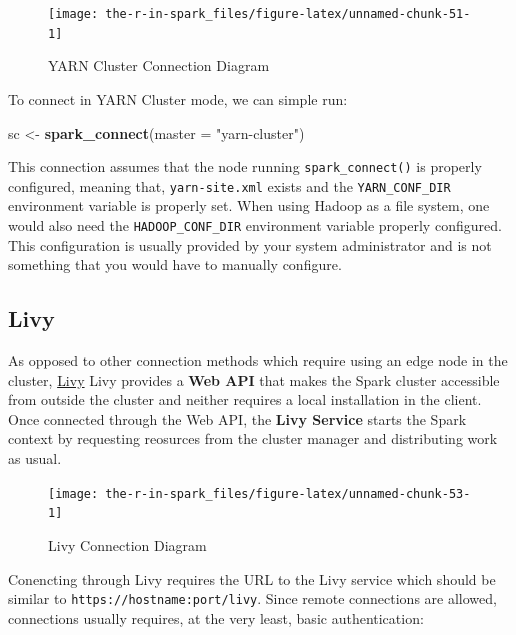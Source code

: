 \documentclass[]{book}
\newenvironment{Shaded}{\begin{snugshade}}{\end{snugshade}}
\newcommand{\DataTypeTok}[1]{\textcolor[rgb]{0.13,0.29,0.53}{#1}}
\newcommand{\KeywordTok}[1]{\textcolor[rgb]{0.13,0.29,0.53}{\textbf{#1}}}
\newcommand{\NormalTok}[1]{#1}
\newcommand{\StringTok}[1]{\textcolor[rgb]{0.31,0.60,0.02}{#1}}
\theoremstyle{definition}
\theoremstyle{definition}
\theoremstyle{definition}
\theoremstyle{remark}
\begin{document}
\begin{figure}

{\centering \texttt{[image: the-r-in-spark\_files/figure-latex/unnamed-chunk-51-1]} 

}

\caption{YARN Cluster Connection Diagram}\label{fig:unnamed-chunk-51}
\end{figure}

To connect in YARN Cluster mode, we can simple run:

\begin{Shaded}
\begin{Highlighting}[]
\NormalTok{sc <-}\StringTok{ }\KeywordTok{spark_connect}\NormalTok{(}\DataTypeTok{master =} \StringTok{"yarn-cluster"}\NormalTok{)}
\end{Highlighting}
\end{Shaded}

This connection assumes that the node running \texttt{spark\_connect()}
is properly configured, meaning that, \texttt{yarn-site.xml} exists and
the \texttt{YARN\_CONF\_DIR} environment variable is properly set. When
using Hadoop as a file system, one would also need the
\texttt{HADOOP\_CONF\_DIR} environment variable properly configured.
This configuration is usually provided by your system administrator and
is not something that you would have to manually configure.

\hypertarget{livy}{%
\subsection{Livy}\label{livy}}

As opposed to other connection methods which require using an edge node
in the cluster, \href{clusters-livy}{Livy} Livy provides a \textbf{Web
API} that makes the Spark cluster accessible from outside the cluster
and neither requires a local installation in the client. Once connected
through the Web API, the \textbf{Livy Service} starts the Spark context
by requesting reosurces from the cluster manager and distributing work
as usual.

\begin{figure}

{\centering \texttt{[image: the-r-in-spark\_files/figure-latex/unnamed-chunk-53-1]} 

}

\caption{Livy Connection Diagram}\label{fig:unnamed-chunk-53}
\end{figure}

Conencting through Livy requires the URL to the Livy service which
should be similar to \texttt{https://hostname:port/livy}. Since remote
connections are allowed, connections usually requires, at the very
least, basic authentication:
\end{document}
